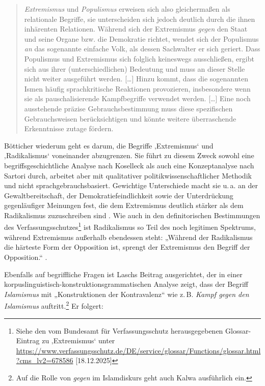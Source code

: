 \begin{quote}
\emph{Extremismus} und \emph{Populismus} erweisen sich also gleichermaßen als relationale Begriffe, sie unterscheiden sich jedoch deutlich durch die ihnen inhärenten Relationen. Während sich der Extremismus \emph{gegen} den Staat und seine Organe bzw. die Demokratie richtet, wendet sich der Populismus \emph{an} das sogenannte einfache Volk, als dessen Sachwalter er sich geriert. Dass Populismus und Extremismus sich folglich keineswegs ausschließen, ergibt sich aus ihrer (unterschiedlichen) Bedeutung und muss an dieser Stelle nicht weiter ausgeführt werden. {[}\ldots{]} Hinzu kommt, dass die sogenannten Ismen häufig sprachkritische Reaktionen provozieren, insbesondere wenn sie als pauschalisierende Kampfbegriffe verwendet werden. {[}\ldots{]} Eine noch ausstehende präzise Gebrauchsbestimmung muss diese spezifischen Gebrauchsweisen berücksichtigen und könnte weitere überraschende Erkenntnisse zutage fördern. \autocite[29]{niehrPopulismusExtremismusHeute2019}
\end{quote}

Bötticher \autocite*{botticherRadikalismusUndExtremismus2017} wiederum geht es darum, die Begriffe ‚Extremismus` und ‚Radikalismus` voneinander abzugrenzen. Sie führt zu diesem Zweck sowohl eine begriffsgeschichtliche Analyse nach Koselleck als auch eine Konzeptanalyse nach Sartori durch, arbeitet aber mit qualitativer politikwissenschaftlicher Methodik und nicht sprachgebrauchsbasiert. Gewichtige Unterschiede macht sie u.\,a. an der Gewaltbereitschaft, der Demokratiefeindlichkeit sowie der Unterdrückung gegenläufiger Meinungen fest, die dem Extremismus deutlich stärker als dem Radikalismus zuzuschreiben sind \autocite[340-341]{botticherRadikalismusUndExtremismus2017}. Wie auch in den definitorischen Bestimmungen des Verfassungsschutzes\footnote{Siehe den vom Bundesamt für Verfassungsschutz herausgegebenen Glossar-Eintrag zu ‚Extremismus` unter \url{https://www.verfassungsschutz.de/DE/service/glossar/Functions/glossar.html?cms_lv2=678586} {[}18.12.2025{]}} ist Radikalismus so Teil des noch legitimen Spektrums, während Extremismus außerhalb ebendessen steht: „Während der Radikalismus die härteste Form der Opposition ist, sprengt der Extremismus den Begriff der Opposition.`` \autocite*[341]{botticherRadikalismusUndExtremismus2017}.

Ebenfalls auf begriffliche Fragen ist Laschs \autocite*{laschZurVereinbarkeitDiskurslinguistisch2014} Beitrag ausgerichtet, der in einer korpuslinguistisch-konstruktionsgrammatischen Analyse zeigt, dass der Begriff \emph{Islamismus} mit „Konstruktionen der Kontravalenz`` wie z.\,B. \emph{Kampf gegen den Islamismus} auftritt.\footnote{Auf die Rolle von \emph{gegen} im Islamdiskurs geht auch Kalwa \autocite*[66-76]{kalwaKonzeptIslamDiskurslinguistische2013} ausführlich ein.} Er folgert:

